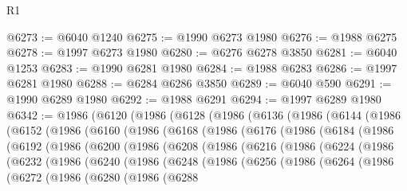 \begin{lexlean}{R1}
\begin{coremodule}
@6273 := @6040 @1240
@6275 := @1990 @6273 @1980
@6276 := @1988 @6275
@6278 := @1997 @6273 @1980
@6280 := @6276 @6278 @3850
@6281 := @6040 @1253
@6283 := @1990 @6281 @1980
@6284 := @1988 @6283
@6286 := @1997 @6281 @1980
@6288 := @6284 @6286 @3850
@6289 := @6040 @590
@6291 := @1990 @6289 @1980
@6292 := @1988 @6291
@6294 := @1997 @6289 @1980
@6342 := @1986
    (@6120
      (@1986
        (@6128
          (@1986
            (@6136
              (@1986
                (@6144
                  (@1986
                    (@6152
                      (@1986
                        (@6160
                          (@1986
                            (@6168
                              (@1986
                                (@6176
                                  (@1986
                                    (@6184
                                      (@1986
                                        (@6192
                                          (@1986
                                            (@6200
                                              (@1986
                                                (@6208
                                                  (@1986
                                                    (@6216
                                                      (@1986
                                                        (@6224
                                                          (@1986
                                                            (@6232
                                                              (@1986
                                                                (@6240
                                                                  (@1986
                                                                    (@6248
                                                                      (@1986
                                                                        (@6256
                                                                          (@1986
                                                                            (@6264
                                                                              (@1986
                                                                                (@6272
                                                                                  (@1986
                                                                                    (@6280
                                                                                      (@1986
                                                                                        (@6288

\end{coremodule}
\end{lexlean}
